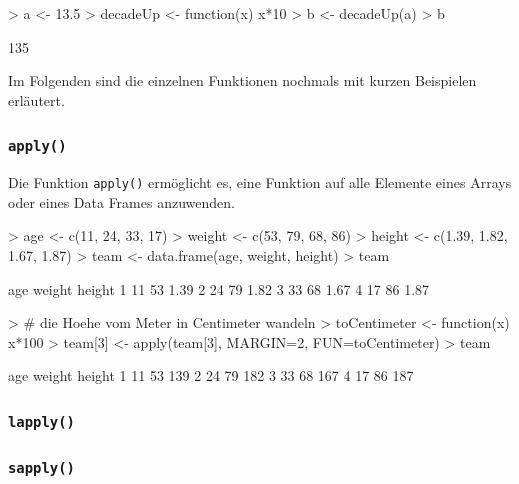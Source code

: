 \begin{Schunk}
\begin{Sinput}
> a <- 13.5
> decadeUp <- function(x) {x*10}
> b <- decadeUp(a)
> b
\end{Sinput}
\begin{Soutput}
[1] 135
\end{Soutput}
\end{Schunk}

Im Folgenden sind die einzelnen Funktionen nochmals mit kurzen 
Beispielen erläutert.

\subsubsection{\lstinline{apply()}}
Die Funktion \lstinline{apply()} ermöglicht es, eine Funktion auf
alle Elemente eines Arrays oder eines Data Frames anzuwenden.

\begin{Schunk}
\begin{Sinput}
> age <- c(11, 24, 33, 17)
> weight <- c(53, 79, 68, 86)
> height <- c(1.39, 1.82, 1.67, 1.87)
> team <- data.frame(age, weight, height)
> team
\end{Sinput}
\begin{Soutput}
  age weight height
1  11     53   1.39
2  24     79   1.82
3  33     68   1.67
4  17     86   1.87
\end{Soutput}
\begin{Sinput}
> # die Hoehe vom Meter in Centimeter wandeln
> toCentimeter <- function(x) {x*100}
> team[3] <- apply(team[3], MARGIN=2, FUN=toCentimeter)
> team
\end{Sinput}
\begin{Soutput}
  age weight height
1  11     53    139
2  24     79    182
3  33     68    167
4  17     86    187
\end{Soutput}
\end{Schunk}

\subsubsection{\lstinline{lapply()}}
\subsubsection{\lstinline{sapply()}}
